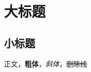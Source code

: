 \hypertarget{ux5927ux6807ux9898}{%
\section{大标题}\label{ux5927ux6807ux9898}}

\hypertarget{ux5c0fux6807ux9898}{%
\subsection{小标题}\label{ux5c0fux6807ux9898}}

正文，\textbf{粗体}，\emph{斜体}，\sout{删除线}
